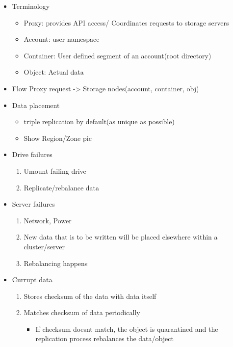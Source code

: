 \documentclass{article}
\begin{document}
\begin{itemize}
\item Terminology
\begin{itemize}
\item Proxy: provides API access/ Coordinates requests to storage
servers
\item Account: user namespace
\item Container: User defined segment of an account(root directory)
\item Object: Actual data
\end{itemize}

\item Flow
Proxy request -> Storage nodes(account, container, obj)

\item Data placement
\begin{itemize}
\item triple replication by default(as unique as possible)
\item Show Region/Zone pic
\end{itemize}

\item Drive failures
\begin{enumerate}
\item Umount failing drive
\item Replicate/rebalance data
\end{enumerate}

\item Server failures
\begin{enumerate}
\item Network, Power
\item New data that is to be written will be placed elsewhere within a
cluster/server
\item Rebalancing happens
\end{enumerate}

\item Currupt data
\begin{enumerate}
\item Stores checksum of the data with data itself
\item Matches checksum of data periodically
\begin{itemize}
\item If checksum doesnt match, the object is quarantined and the
replication process rebalances the data/object
\end{itemize}
\end{enumerate}


\end{itemize}
\end{document}
